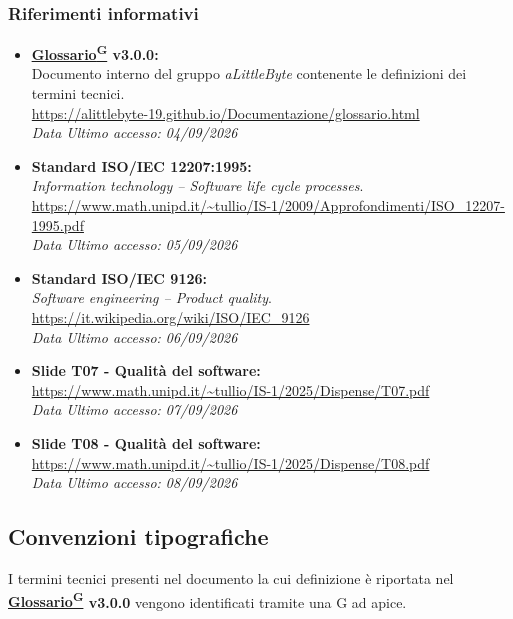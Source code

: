 ﻿\documentclass[a4paper,12pt]{article}
\providecommand{\glslink}[2]{\href{https://alittlebyte-19.github.io/Documentazione/glossario.html\#gls-#1}{\underline{#2}\textsuperscript{\scriptsize G}}}
\begin{document}
\subsubsection{Riferimenti informativi}
\begin{itemize}
    \item \textbf{\glslink{glossario}{Glossario} v3.0.0:}\\
    Documento interno del gruppo \textit{aLittleByte} contenente le definizioni dei termini tecnici.\\
    \url{https://alittlebyte-19.github.io/Documentazione/glossario.html}\\
    \textit{Data Ultimo accesso: 04/09/2026}

    \item \textbf{Standard ISO/IEC 12207:1995:}\\
    \textit{Information technology -- Software life cycle processes}.\\
    \url{https://www.math.unipd.it/~tullio/IS-1/2009/Approfondimenti/ISO_12207-1995.pdf}\\
    \textit{Data Ultimo accesso: 05/09/2026}

    \item \textbf{Standard ISO/IEC 9126:}\\
    \textit{Software engineering -- Product quality}.\\
    \url{https://it.wikipedia.org/wiki/ISO/IEC_9126}\\
    \textit{Data Ultimo accesso: 06/09/2026}

    \item \textbf{Slide T07 - Qualità del software:}\\
    \url{https://www.math.unipd.it/~tullio/IS-1/2025/Dispense/T07.pdf}\\
    \textit{Data Ultimo accesso: 07/09/2026}

    \item \textbf{Slide T08 - Qualità del software:}\\
    \url{https://www.math.unipd.it/~tullio/IS-1/2025/Dispense/T08.pdf}\\
    \textit{Data Ultimo accesso: 08/09/2026}
\end{itemize}

\subsection{Convenzioni tipografiche}
I termini tecnici presenti nel documento la cui definizione è riportata nel \textbf{\glslink{glossario}{Glossario} v3.0.0} vengono identificati tramite una G ad apice.
\end{document}
